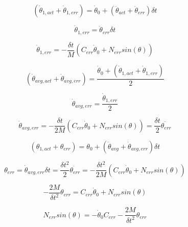 \begin{equation}
(\dot{\theta}_{1, act} + \dot{\theta}_{1, err}) = \dot{\theta}_{0} + (\ddot{\theta}_{act} + \ddot{\theta}_{err}) \delta t
\end{equation}

\begin{equation}
\dot{\theta}_{1, err} = \ddot{\theta}_{err} \delta t
\end{equation}

\begin{equation}
\dot{\theta}_{1, err} = - \dfrac{\delta t}{M}(C_{err} \dot{\theta}_{0} + N_{err} sin(\theta))
\end{equation}

\begin{equation}
(\dot{\theta}_{avg, act} + \dot{\theta}_{avg, err}) = \dfrac{\dot{\theta}_{0} + (\dot{\theta}_{1, act} + \dot{\theta}_{1, err})}{2}
\end{equation}

\begin{equation}
\dot{\theta}_{avg, err} = \dfrac{\dot{\theta}_{1, err}}{2}
\end{equation}

\begin{equation}
\dot{\theta}_{avg, err} = - \dfrac{\delta t}{2M}(C_{err} \dot{\theta}_{0} + N_{err} sin(\theta)) = \dfrac{\delta t}{2} \ddot{\theta_{err}}
\end{equation}


\begin{equation}
(\theta_{1, act} + \theta_{err}) = \theta_{0} + (\dot{\theta}_{avg} + \dot{\theta}_{avg, err}) \delta t
\end{equation}

\begin{equation}
\theta_{err} = \dot{\theta}_{avg, err} \delta t = \dfrac{\delta t^{2}}{2} \ddot{\theta_{err}} = - \dfrac{\delta t^{2}}{2M}(C_{err} \dot{\theta}_{0} + N_{err} sin(\theta))
\end{equation}

\begin{equation}
- \dfrac{2M}{\delta t^{2}} \theta_{err} = C_{err} \dot{\theta}_{0} + N_{err} sin(\theta)
\end{equation}

\begin{equation}
N_{err} sin(\theta) = 
- \dot{\theta}_{0} C_{err}
- \dfrac{2M}{\delta t^{2}} \theta_{err}
\end{equation}

